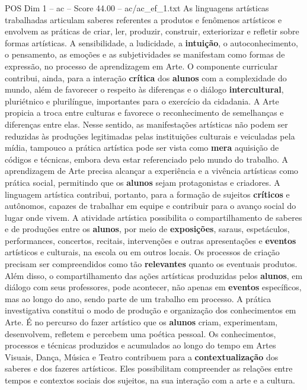 \begin{textsample}{POS Dim 1 – ac – Score 44.00 – ac/ac\_ef\_1.txt}
As linguagens artísticas trabalhadas articulam saberes referentes a produtos e fenômenos artísticos e envolvem as práticas de criar, ler, produzir, construir, exteriorizar e refletir sobre formas artísticas.
A sensibilidade, a ludicidade, a \textbf{intuição}, o autoconhecimento, o pensamento, as emoções e as subjetividades se manifestam como formas de expressão, no processo de aprendizagem em Arte.
O componente curricular contribui, ainda, para a interação \textbf{crítica} dos \textbf{alunos} com a complexidade do mundo, além de favorecer o respeito às diferenças e o diálogo \textbf{intercultural}, pluriétnico e plurilíngue, importantes para o exercício da cidadania.
A Arte propicia a troca entre culturas e favorece o reconhecimento de semelhanças e diferenças entre elas.
Nesse sentido, as manifestações artísticas não podem ser reduzidas às produções legitimadas pelas instituições culturais e veiculadas pela mídia, tampouco a prática artística pode ser vista como \textbf{mera} aquisição de códigos e técnicas, embora deva estar referenciado pelo mundo do trabalho.
A aprendizagem de Arte precisa alcançar a experiência e a vivência artísticas como prática social, permitindo que os \textbf{alunos} sejam protagonistas e criadores.
A linguagem artística contribui, portanto, para a formação de sujeitos \textbf{críticos} e autônomos, capazes de trabalhar em equipe e contribuir para o avanço social do lugar onde vivem.
A atividade artística possibilita o compartilhamento de saberes e de produções entre os \textbf{alunos}, por meio de \textbf{exposições}, saraus, espetáculos, performances, concertos, recitais, intervenções e outras apresentações e \textbf{eventos} artísticos e culturais, na escola ou em outros locais.
Os processos de criação precisam ser compreendidos como tão \textbf{relevantes} quanto os eventuais produtos.
Além disso, o compartilhamento das ações artísticas produzidas pelos \textbf{alunos}, em diálogo com seus professores, pode acontecer, não apenas em \textbf{eventos} específicos, mas ao longo do ano, sendo parte de um trabalho em processo.
A prática investigativa constitui o modo de produção e organização dos conhecimentos em Arte.
É no percurso do fazer artístico que os \textbf{alunos} criam, experimentam, desenvolvem, refletem e percebem uma poética pessoal.
Os conhecimentos, processos e técnicas produzidos e acumulados ao longo do tempo em Artes Visuais, Dança, Música e Teatro contribuem para a \textbf{contextualização} dos saberes e dos fazeres artísticos.
Eles possibilitam compreender as relações entre tempos e contextos sociais dos sujeitos, na sua interação com a arte e a cultura.

\end{textsample}
